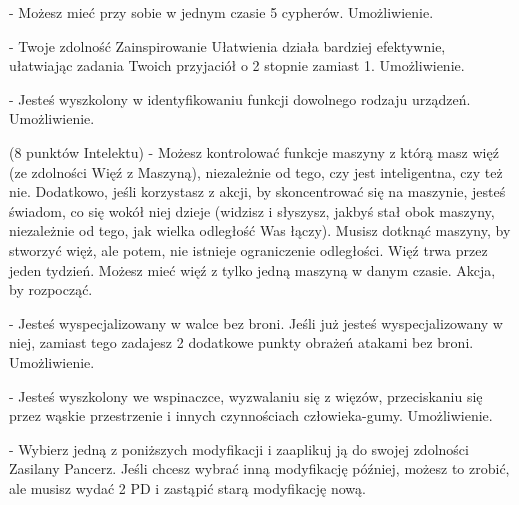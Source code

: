 { - Możesz mieć przy sobie w jednym czasie 5 cypherów. Umożliwienie.

 - Twoje zdolność Zainspirowanie Ułatwienia działa bardziej efektywnie, ułatwiając zadania Twoich przyjaciół o 2 stopnie zamiast 1. Umożliwienie.

 - Jesteś wyszkolony w identyfikowaniu funkcji dowolnego rodzaju urządzeń. Umożliwienie.

 (8 punktów Intelektu) - Możesz kontrolować funkcje maszyny z którą masz więź (ze zdolności Więź z Maszyną), niezależnie od tego, czy jest inteligentna, czy też nie. Dodatkowo, jeśli korzystasz z akcji, by skoncentrować się na maszynie, jesteś świadom, co się wokół niej dzieje (widzisz i słyszysz, jakbyś stał obok maszyny, niezależnie od tego, jak wielka odległość Was łączy). Musisz dotknąć maszyny, by stworzyć więż, ale potem, nie istnieje ograniczenie odległości. Więź trwa przez jeden tydzień. Możesz mieć więź z tylko jedną maszyną w danym czasie. Akcja, by rozpocząć. 

 - Jesteś wyspecjalizowany w walce bez broni. Jeśli już jesteś wyspecjalizowany w niej, zamiast tego zadajesz 2 dodatkowe punkty obrażeń atakami bez broni. Umożliwienie. 

 - Jesteś wyszkolony we wspinaczce, wyzwalaniu się z więzów, przeciskaniu się przez wąskie przestrzenie i innych czynnościach człowieka-gumy. Umożliwienie.

 - Wybierz jedną z poniższych modyfikacji i zaaplikuj ją do swojej zdolności Zasilany Pancerz. Jeśli chcesz wybrać inną modyfikację później, możesz to zrobić, ale musisz wydać 2 PD i zastąpić starą modyfikację nową. 

}
